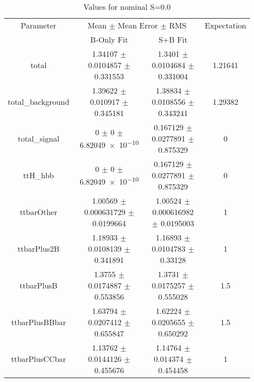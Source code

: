 \begin{table}
\centering
\caption{Values for nominal S=0.0}
\begin{tabular}{cccc}
\toprule
Parameter & \multicolumn{2}{c}{Mean $\pm$ Mean Error $\pm$ RMS} & Expectation\\
 & B-Only Fit & S+B Fit & \\
\midrule
total & \num{1.34107} $\pm$ \num{0.0104857} $\pm$ \num{0.331553} & \num{1.3401} $\pm$ \num{0.0104684} $\pm$ \num{0.331004} & \num{1.21641}\\
total\_background & \num{1.39622} $\pm$ \num{0.010917} $\pm$ \num{0.345181} & \num{1.38834} $\pm$ \num{0.0108556} $\pm$ \num{0.343241} & \num{1.29382}\\
total\_signal & \num{0} $\pm$ \num{0} $\pm$ \num{6.82049e-10} & \num{0.167129} $\pm$ \num{0.0277891} $\pm$ \num{0.875329} & \num{0}\\
ttH\_hbb & \num{0} $\pm$ \num{0} $\pm$ \num{6.82049e-10} & \num{0.167129} $\pm$ \num{0.0277891} $\pm$ \num{0.875329} & \num{0}\\
ttbarOther & \num{1.00569} $\pm$ \num{0.000631729} $\pm$ \num{0.0199664} & \num{1.00524} $\pm$ \num{0.000616982} $\pm$ \num{0.0195003} & \num{1}\\
ttbarPlus2B & \num{1.18933} $\pm$ \num{0.0108139} $\pm$ \num{0.341891} & \num{1.16893} $\pm$ \num{0.0104783} $\pm$ \num{0.33128} & \num{1}\\
ttbarPlusB & \num{1.3755} $\pm$ \num{0.0174887} $\pm$ \num{0.553856} & \num{1.3731} $\pm$ \num{0.0175257} $\pm$ \num{0.555028} & \num{1.5}\\
ttbarPlusBBbar & \num{1.63794} $\pm$ \num{0.0207412} $\pm$ \num{0.655847} & \num{1.62224} $\pm$ \num{0.0205655} $\pm$ \num{0.650292} & \num{1.5}\\
ttbarPlusCCbar & \num{1.13762} $\pm$ \num{0.0144126} $\pm$ \num{0.455676} & \num{1.14764} $\pm$ \num{0.014374} $\pm$ \num{0.454458} & \num{1}\\
\bottomrule
\end{tabular}
\end{table}